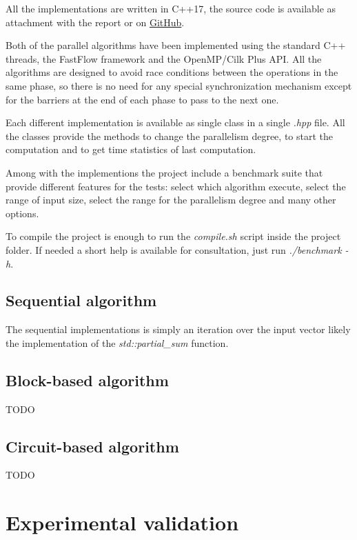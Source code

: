 \documentclass{article}
\begin{document}
All the implementations are written in C++17, the source code is available as attachment with the report or on \href{https://github.com/GaspareG/ParallelPrefix}{GitHub}.

Both of the parallel algorithms have been implemented using the standard C++ threads, the FastFlow framework and the OpenMP/Cilk Plus API. All the algorithms are designed to avoid race conditions between the operations in the same phase, so there is no need for any special synchronization mechanism except for the barriers at the end of each phase to pass to the next one.

Each different implementation is available as single class in a single \textit{.hpp} file. All the classes provide the methods to change the parallelism degree, to start the computation and to get time statistics of last computation.

\smallskip

Among with the implementions the project include a benchmark suite that provide different features for the tests: select which algorithm execute, select the range of input size, select the range for the parallelism degree and many other options.

\smallskip

To compile the project is enough to run the \textit{compile.sh} script inside the project folder.
If needed a short help is available for consultation, just run \textit{./benchmark -h}.

\subsection{Sequential algorithm}

The sequential implementations is simply an iteration over the input vector likely the implementation of the \textit{std::partial\_sum} function.

\subsection{Block-based algorithm}

TODO

\subsection{Circuit-based algorithm}

TODO

\section{Experimental validation}
\end{document}
